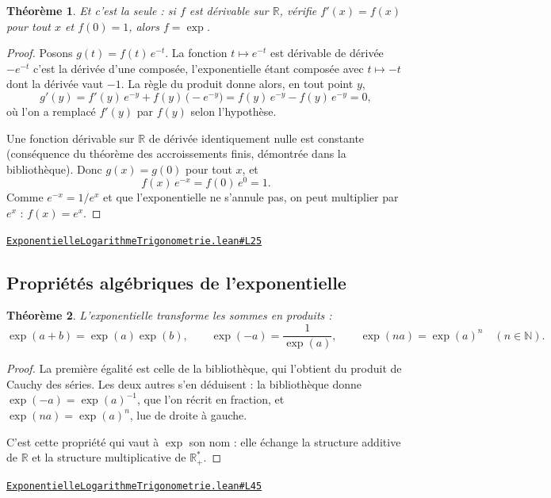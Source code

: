 \documentclass[11pt,a4paper]{article}
\theoremstyle{definition}
\theoremstyle{plain}
\newtheorem{theoreme}{Théorème}
\newcommand{\source}[2]{\par\smallskip\noindent\hfill{\footnotesize\href{#1}{\texttt{#2}}}\par\smallskip}
\begin{document}
\begin{theoreme}
Et c'est la seule : si $f$ est dérivable sur $\mathbb{R}$, vérifie $f'(x) = f(x)$ pour tout
$x$ et $f(0) = 1$, alors $f = \exp$.
\end{theoreme}

\begin{proof}
Posons $g(t) = f(t)\,e^{-t}$. La fonction $t \mapsto e^{-t}$ est dérivable de dérivée
$-e^{-t}$ \textemdash{} c'est la dérivée d'une composée, l'exponentielle étant composée avec
$t \mapsto -t$ dont la dérivée vaut $-1$. La règle du produit donne alors, en tout point
$y$,
\[ g'(y) = f'(y)\,e^{-y} + f(y)\,\bigl(-e^{-y}\bigr)
        = f(y)\,e^{-y} - f(y)\,e^{-y} = 0 , \]
où l'on a remplacé $f'(y)$ par $f(y)$ selon l'hypothèse.

Une fonction dérivable sur $\mathbb{R}$ de dérivée identiquement nulle est constante
(conséquence du théorème des accroissements finis, démontrée dans la bibliothèque). Donc
$g(x) = g(0)$ pour tout $x$, et
\[ f(x)\,e^{-x} = f(0)\,e^{0} = 1 . \]
Comme $e^{-x} = 1/e^{x}$ et que l'exponentielle ne s'annule pas, on peut multiplier par
$e^{x}$ : $f(x) = e^{x}$.
\end{proof}
\source{https://github.com/Commutator-IO/learn-lean/blob/main/cours/02-lycee/05-exponentielle-logarithme-trigonometrie/ExponentielleLogarithmeTrigonometrie.lean\#L25}{ExponentielleLogarithmeTrigonometrie.lean\#L25}

\subsection{Propriétés algébriques de l'exponentielle}

\begin{theoreme}
L'exponentielle transforme les sommes en produits :
\[ \exp(a + b) = \exp(a)\exp(b), \qquad
   \exp(-a) = \frac{1}{\exp(a)}, \qquad
   \exp(na) = \exp(a)^{n} \quad (n \in \mathbb{N}) . \]
\end{theoreme}

\begin{proof}
La première égalité est celle de la bibliothèque, qui l'obtient du produit de Cauchy des
séries. Les deux autres s'en déduisent : la bibliothèque donne $\exp(-a) = \exp(a)^{-1}$,
que l'on récrit en fraction, et $\exp(na) = \exp(a)^{n}$, lue de droite à gauche.

\medskip\noindent
C'est cette propriété qui vaut à $\exp$ son nom : elle échange la structure additive de
$\mathbb{R}$ et la structure multiplicative de $\mathbb{R}_{+}^{*}$.
\end{proof}
\source{https://github.com/Commutator-IO/learn-lean/blob/main/cours/02-lycee/05-exponentielle-logarithme-trigonometrie/ExponentielleLogarithmeTrigonometrie.lean\#L45}{ExponentielleLogarithmeTrigonometrie.lean\#L45}
\end{document}

